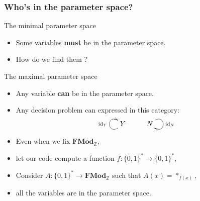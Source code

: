 \documentclass[10pt]{beamer}
\newcommand{\lcat}[1]{\mathbf{#1}}
\DeclareMathOperator{\id}{id}
\newcommand{\Z}{\mathbb{Z}}
\newcommand{\ra}{\rightarrow}
\begin{document}
\begin{frame}
  \frametitle{Who's in the parameter space?}
  
  \begin{block}{The minimal parameter space}
    \begin{itemize}
    \item Some variables \textbf{must} be in the parameter space.
    \item How do we find them ?
    \end{itemize}
  \end{block}

  \begin{block}{The maximal parameter space}
    \begin{itemize}
    \item Any variable \textbf{can} be in the parameter space.
    \item Any decision problem can expressed in this category:
      \[\xymatrix{ Y \ar@(dl,ul)^{\id_Y} & N \ar@(ur,dr)^{\id_N} }\]
    \item Even when we fix $\lcat{FMod}_{\Z}$,
    \item let our code compute a function $f :\{0,1\}^\ast\ra\{0,1\}^\ast$,
    \item Consider $A:\{0,1\}^\ast\ra\lcat{FMod}_{\Z}$ such that $A(x) =
      \ast_{f(x)}$,
    \item all the variables are in the parameter space.
    \end{itemize}
  \end{block}
\end{frame}
\end{document}
